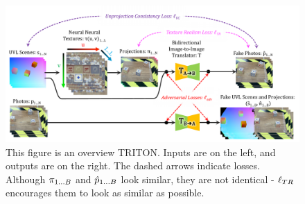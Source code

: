 \documentclass{article}
\begin{document}
\begin{figure}[H]
	\begin{center}
		\includegraphics[width=400pt]{../images/main_diagram_beautiful.pdf}
	\end{center}
	\caption{
		This figure is an overview TRITON.
		Inputs are on the left, and outputs are on the right.
		The dashed arrows indicate losses.
		Although $\pi_{1\dots B}$ and $\hat{p}_{1\dots B}$ look similar, they are not identical - $\ell_{TR}$ encourages them to look as similar as possible.
	}
	\label{fig:main_diagram}
\end{figure}
\end{document}
